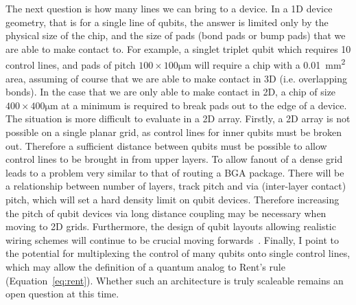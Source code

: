 The next question is how many lines we can bring to a device. In a 1D device geometry, that is for a single line of qubits, the answer is limited only by the
physical size of the chip, and the size of pads (bond pads or bump pads) that we are able to make contact to. For example, a singlet triplet qubit which requires
10 control lines, and pads of pitch $100\times100\si{\micro\meter}$ will require a chip with a \SI{0.01}{\square\milli\meter} area, assuming of course that we are
able to make contact in 3D (i.e. overlapping bonds). In the case that we are only able to make contact in 2D, a chip of size $400\times400\si{\micro\meter}$ at a
minimum is required to break pads out to the edge of a device. The situation is more difficult to evaluate in a 2D array. Firstly, a 2D array is not possible on
a single planar grid, as control lines for inner qubits must be broken out. Therefore a sufficient distance between qubits must be possible to allow control lines
to be brought in from upper layers. To allow fanout of a dense grid leads to a problem very similar to that of routing a BGA package. There will be a relationship
between number of layers, track pitch and via (inter-layer contact) pitch, which will set a hard density limit on qubit devices. Therefore increasing the pitch of
qubit devices via long distance coupling may be necessary when moving to 2D grids. Furthermore, the design of qubit layouts allowing realistic wiring schemes will
continue to be crucial moving forwards~\cite{10.1038/s41534-018-0074-2}. Finally, I point to the potential for multiplexing the control of many qubits onto single
control lines, which may allow the definition of a quantum analog to Rent's rule~\cite{FRANKE20191} (Equation~\ref{eq:rent}). Whether such an architecture is truly
scaleable remains an open question at this time.


